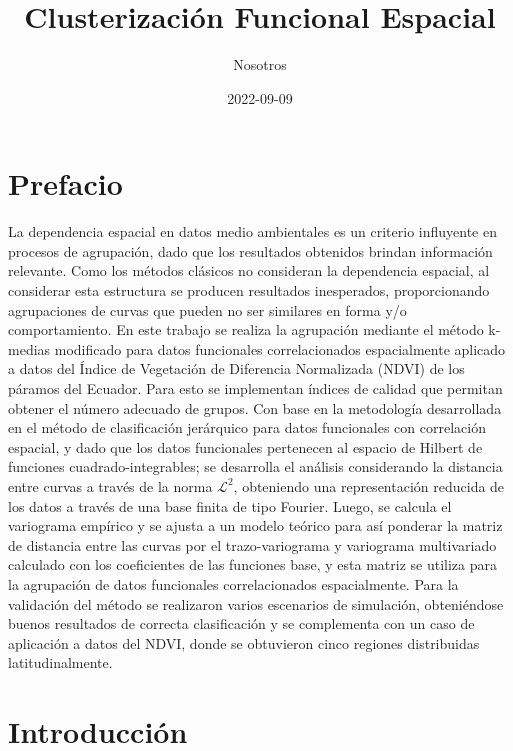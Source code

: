 \documentclass[
]{book}
\title{Clusterización Funcional Espacial}
\author{Nosotros}
\date{2022-09-09}
\begin{document}
\maketitle

{
\setcounter{tocdepth}{1}
\tableofcontents
}
\hypertarget{prefacio}{%
\chapter*{Prefacio}\label{prefacio}}


La dependencia espacial en datos medio ambientales es un criterio influyente en procesos de agrupación, dado que los resultados obtenidos brindan información relevante. Como los métodos clásicos no consideran la dependencia espacial, al considerar esta estructura se producen resultados inesperados, proporcionando agrupaciones de curvas que pueden no ser similares en forma y/o comportamiento. En este trabajo se realiza la agrupación mediante el método k-medias modificado para datos funcionales correlacionados espacialmente aplicado a datos del Índice de Vegetación de Diferencia Normalizada (NDVI) de los páramos del Ecuador. Para esto se implementan índices de calidad que permitan obtener el número adecuado de grupos. Con base en la metodología desarrollada en el método de clasificación jerárquico para datos funcionales con correlación espacial, y dado que los datos funcionales pertenecen al espacio de Hilbert de funciones cuadrado-integrables; se desarrolla el análisis considerando la distancia entre curvas a través de la norma \(\mathcal{L}^2\), obteniendo una representación reducida de los datos a través de una base finita de tipo Fourier. Luego, se calcula el variograma empírico y se ajusta a un modelo teórico para así ponderar la matriz de distancia entre las curvas por el trazo-variograma y variograma multivariado calculado con los coeficientes de las funciones base, y esta matriz se utiliza para la agrupación de datos funcionales correlacionados espacialmente. Para la validación del método se realizaron varios escenarios de simulación, obteniéndose buenos resultados de correcta clasificación y se complementa con un caso de aplicación a datos del NDVI, donde se obtuvieron cinco regiones distribuidas latitudinalmente.

\hypertarget{introducciuxf3n}{%
\chapter{Introducción}\label{introducciuxf3n}}
\end{document}
